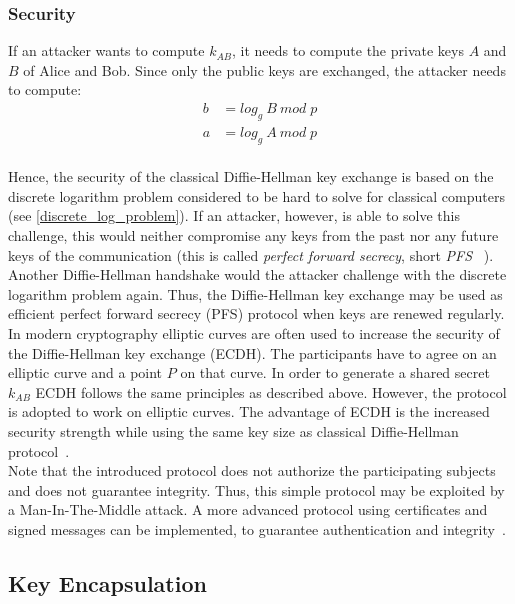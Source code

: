 \subsubsection{Security}
If an attacker wants to compute $k_{AB}$, it needs to compute the private keys $A$ and $B$ of Alice and Bob. Since only the public keys are exchanged, the attacker needs to compute:
\begin{equation*}
\begin{split}
b &= log_g\:B\:mod\;p\\ 
a &= log_g\:A\:mod\;p
\end{split}
\end{equation*}
\\
Hence, the security of the classical Diffie-Hellman key exchange is based on the discrete logarithm problem considered to be hard to solve for classical computers (see \autoref{discrete_log_problem}). If an attacker, however, is able to solve this challenge, this would neither compromise any keys from the past nor any future keys of the communication (this is called \textit{perfect forward secrecy}, short \textit{PFS} ~\parencite{ITSicherheit}). Another Diffie-Hellman handshake would the attacker challenge with the discrete logarithm problem again. Thus, the Diffie-Hellman key exchange may be used as efficient perfect forward secrecy (PFS) protocol when keys are renewed regularly.\\
In modern cryptography elliptic curves are often used to increase the security of the Diffie-Hellman key exchange (ECDH). The participants have to agree on an elliptic curve and a point $P$ on that curve. In order to generate a shared secret $k_{AB}$ ECDH follows the same principles as described above. However, the protocol is adopted to work on elliptic curves. The advantage of ECDH is the increased security strength while using the same key size as classical Diffie-Hellman protocol~\parencite{ITSicherheit}.
\\
Note that the introduced protocol does not authorize the participating subjects and does not guarantee integrity. Thus, this simple protocol may be exploited by a Man-In-The-Middle attack. A more advanced protocol using certificates and signed messages can be implemented, to guarantee authentication and integrity~\parencite{ITSicherheit}.

\subsection{Key Encapsulation}

